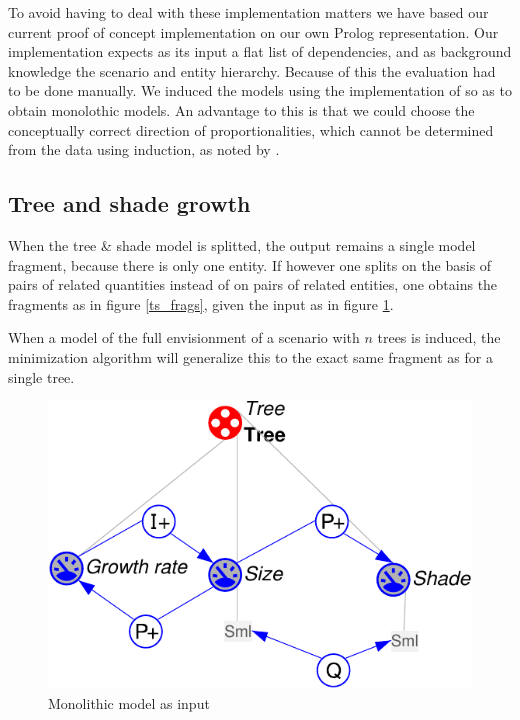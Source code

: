 \documentclass{article} %
\begin{document}
To avoid having to deal with these implementation matters we have based our
current proof of concept implementation on our own Prolog representation. Our
implementation expects as its input a flat list of dependencies, and as
background knowledge the scenario and entity hierarchy. Because of this the
evaluation had to be done manually. We induced the models using the
implementation of \cite{buisman} so as to obtain monolothic models. An
advantage to this is that we could choose the conceptually correct direction of
proportionalities, which cannot be determined from the data using induction, as
noted by \cite{vanweelden}.


\subsection{Tree and shade growth} 

When the tree \& shade model is splitted, the output remains a single model
fragment, because there is only one entity. If however one splits on the basis
of pairs of related quantities instead of on pairs of related entities, one
obtains the fragments as in figure \ref{ts_frags}, given the input as in figure
\ref{ts_mono}.

When a model of the full envisionment of a scenario with $n$ trees is induced,
the minimization algorithm will generalize this to the exact same fragment as
for a single tree.


\begin{figure}[ht]
\centering
\includegraphics[scale=0.5]{ts_mono-crop.pdf}
\caption{Monolithic model as input}
\label{ts_mono}
\end{figure}
\end{document}
